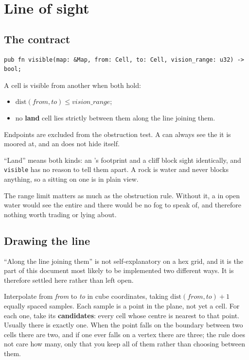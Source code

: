 \documentclass{article}
\begin{document}
\newpage
\section{Line of sight}
\label{proto:los}

\subsection{The contract}

\begin{lstlisting}
pub fn visible(map: &Map, from: Cell, to: Cell, vision_range: u32) -> bool;
\end{lstlisting}

A cell is visible from another when both hold:

\begin{itemize}
    \item $\mathrm{dist}(\mathit{from}, \mathit{to}) \leq \mathit{vision\_range}$;
    \item no \textbf{land} cell lies strictly between them along the line joining them.
\end{itemize}

Endpoints are excluded from the obstruction test. A \ship{} can always see the \island{} it is
moored at, and an \island{} does not hide itself.

``Land'' means both kinds: an \island's footprint and a cliff block sight identically, and
\texttt{visible} has no reason to tell them apart. A rock is water and never blocks anything, so a
\ship{} sitting on one is in plain view.

The range limit matters as much as the obstruction rule. Without it, a \ship{} in open water would
see the entire \archipelago{} and there would be no fog to speak of, and therefore nothing worth
trading or lying about.

\subsection{Drawing the line}
\label{proto:losdecide}

``Along the line joining them'' is not self-explanatory on a hex grid, and it is the part of this
document most likely to be implemented two different ways. It is therefore settled here rather than
left open.

Interpolate from \emph{from} to \emph{to} in cube coordinates, taking
$\mathrm{dist}(\mathit{from},\mathit{to}) + 1$ equally spaced samples. Each sample is a point in
the plane, not yet a cell. For each one, take its \textbf{candidates}: every cell whose centre is
nearest to that point. Usually there is exactly one. When the point falls on the boundary between
two cells there are two, and if one ever falls on a vertex there are three; the rule does not care
how many, only that you keep all of them rather than choosing between them.
\end{document}
